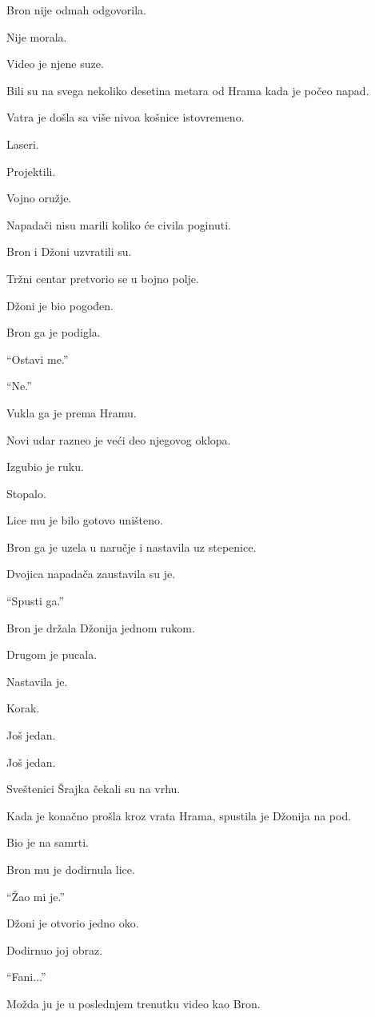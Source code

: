 Bron nije odmah odgovorila.

Nije morala.

Video je njene suze.

\bigskip

Bili su na svega nekoliko desetina metara od Hrama kada je počeo napad.

Vatra je došla sa više nivoa košnice istovremeno.

Laseri.

Projektili.

Vojno oružje.

Napadači nisu marili koliko će civila poginuti.

Bron i Džoni uzvratili su.

Tržni centar pretvorio se u bojno polje.

Džoni je bio pogođen.

Bron ga je podigla.

``Ostavi me.''

``Ne.''

Vukla ga je prema Hramu.

Novi udar razneo je veći deo njegovog oklopa.

Izgubio je ruku.

Stopalo.

Lice mu je bilo gotovo uništeno.

Bron ga je uzela u naručje i nastavila uz stepenice.

Dvojica napadača zaustavila su je.

``Spusti ga.''

Bron je držala Džonija jednom rukom.

Drugom je pucala.

Nastavila je.

Korak.

Još jedan.

Još jedan.

Sveštenici Šrajka čekali su na vrhu.

Kada je konačno prošla kroz vrata Hrama, spustila je Džonija na pod.

Bio je na samrti.

Bron mu je dodirnula lice.

``Žao mi je.''

Džoni je otvorio jedno oko.

Dodirnuo joj obraz.

``Fani...''

Možda ju je u poslednjem trenutku video kao Bron.

